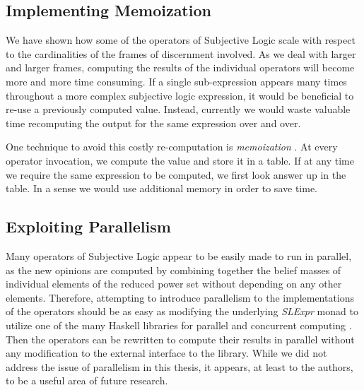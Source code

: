 \documentclass[thesis.tex]{subfiles}
\begin{document}
\subsection{Implementing Memoization}

We have shown how some of the operators of Subjective Logic scale with respect
to the cardinalities of the frames of discernment involved. As we deal with
larger and larger frames, computing the results of the individual operators
will become more and more time consuming. If a single sub-expression appears
many times throughout a more complex subjective logic expression, it would be
beneficial to re-use a previously computed value. Instead, currently we would waste
valuable time recomputing the output for the same expression over and over.

One technique to avoid this costly re-computation is \emph{memoization} \cite{michie1968memo}.
At every operator invocation, we compute the value and store it in a table. If at
any time we require the same expression to be computed, we first look answer up in
the table. In a sense we would use additional memory in order to save time.


\subsection{Exploiting Parallelism}

Many operators of Subjective Logic appear to be easily made to run in parallel,
as the new opinions are computed by combining together the belief
masses of individual elements of the reduced power set without
depending on any other elements. Therefore, attempting to introduce
parallelism to the implementations of the operators should be as easy
as modifying the underlying \emph{SLExpr} monad to utilize one of the
many Haskell libraries for parallel and concurrent computing \cite{marlow2012parallel}.
Then the operators can be rewritten to compute their results
in parallel without any modification to the external interface to the
library. While we did not address the issue of parallelism in this
thesis, it appears, at least to the authors, to be a useful area of
future research.
\end{document}

